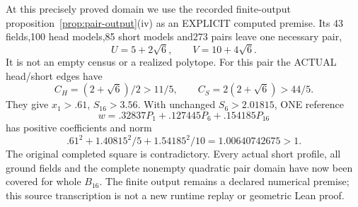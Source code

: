 At this precisely proved domain we use the recorded
finite-output proposition~\ref{prop:pair-output}(iv)
as an EXPLICIT computed premise.
Its 43 fields,100 head models,85 short models
and273 pairs leave one necessary pair,
\[
                  U=5+2\sqrt6,\qquad V=10+4\sqrt6 .
\]
It is not an empty census or a realized polytope.
For this pair the ACTUAL head/short edges have
\[
 C_H=(2+\sqrt6)/2>11/5,\qquad
 C_S=2(2+\sqrt6)>44/5.
\]
They give \(x_1>.61\), \(S_{16}>3.56\).
With unchanged \(S_6>2.01815\), ONE reference
\[
                  w=.32837P_1+.127445P_6+.154185P_{16}
\]
has positive coefficients and norm
\[
                  .61^2+1.40815^2/5+1.54185^2/10
                              =1.00640742675>1 .
\]
The original completed square is contradictory.
Every actual short profile, all ground fields and
the complete nonempty quadratic pair domain have
now been covered for whole \(B_{16}\).
The finite output remains a declared numerical
premise; this source transcription is not a
new runtime replay or geometric Lean proof.

